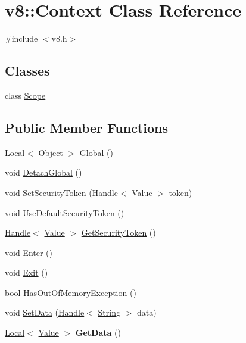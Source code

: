 \hypertarget{classv8_1_1_context}{}\section{v8\+:\+:Context Class Reference}
\label{classv8_1_1_context}


{\ttfamily \#include $<$v8.\+h$>$}

\subsection*{Classes}
\begin{DoxyCompactItemize}
\item 
class \hyperlink{classv8_1_1_context_1_1_scope}{Scope}
\end{DoxyCompactItemize}
\subsection*{Public Member Functions}
\begin{DoxyCompactItemize}
\item 
\hyperlink{classv8_1_1_local}{Local}$<$ \hyperlink{classv8_1_1_object}{Object} $>$ \hyperlink{classv8_1_1_context_af5cd9f97ef6a3307c1c21f80f4b743eb}{Global} ()
\item 
void \hyperlink{classv8_1_1_context_a841c7dd92eb8c57df92a268a164dea97}{Detach\+Global} ()
\item 
void \hyperlink{classv8_1_1_context_a288d8549547f6bdf4312f5333f60f24d}{Set\+Security\+Token} (\hyperlink{classv8_1_1_handle}{Handle}$<$ \hyperlink{classv8_1_1_value}{Value} $>$ token)
\item 
void \hyperlink{classv8_1_1_context_aa9e1a14982b64fd51ab87600a287bad2}{Use\+Default\+Security\+Token} ()
\item 
\hyperlink{classv8_1_1_handle}{Handle}$<$ \hyperlink{classv8_1_1_value}{Value} $>$ \hyperlink{classv8_1_1_context_a8e71e658633518ca7718c0f6e938c6a9}{Get\+Security\+Token} ()
\item 
void \hyperlink{classv8_1_1_context_a6995c49d9897eb49053f07874b825133}{Enter} ()
\item 
void \hyperlink{classv8_1_1_context_a2db09d4fefb26023a40d88972a4c1599}{Exit} ()
\item 
bool \hyperlink{classv8_1_1_context_aadec400a5da1e79e58a8770fd706b9a0}{Has\+Out\+Of\+Memory\+Exception} ()
\item 
void \hyperlink{classv8_1_1_context_aaf39e5adc0ef4081d591952d17c6ada5}{Set\+Data} (\hyperlink{classv8_1_1_handle}{Handle}$<$ \hyperlink{classv8_1_1_string}{String} $>$ data)
\item 
\hypertarget{classv8_1_1_context_a0c5edad65549bf11edce29bfa3bc3aef}{}\hyperlink{classv8_1_1_local}{Local}$<$ \hyperlink{classv8_1_1_value}{Value} $>$ {\bfseries Get\+Data} ()\label{classv8_1_1_context_a0c5edad65549bf11edce29bfa3bc3aef}

\end{DoxyCompactItemize}
